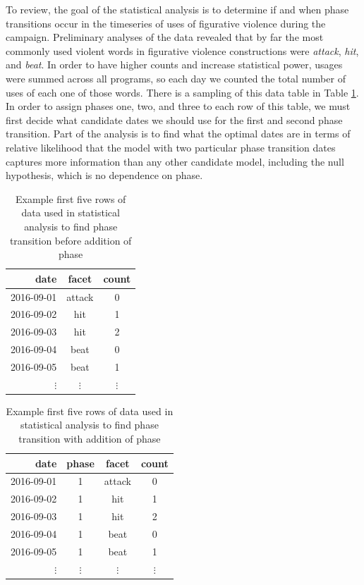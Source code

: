 To review, the goal of the statistical analysis is to determine if and when
phase transitions occur in the timeseries of uses of figurative violence
during the campaign. Preliminary analyses of the data revealed that by far
the most commonly used violent words in figurative violence constructions were
\textit{attack}, \textit{hit}, and \textit{beat}. In order to have higher 
counts and increase statistical power, usages were summed across all programs,
so each day we counted the total number of uses of each one of those words.
There is a sampling of this data table in Table \ref{tab:sample-data}. In 
order to assign phases one, two, and three to each row of this table, we
must first decide what candidate dates we should use for the first and
second phase transition. Part of the analysis is to find what the optimal 
dates are in terms of relative likelihood that the model with two particular
phase transition dates captures more information than any other candidate
model, including the null hypothesis, which is no dependence on phase.

\begin{table}[ht]
    \centering
    \begin{tabular}{|r|cc|}
        \hline
        date       &   facet    &  count     \\
        \hline
        2016-09-01 &     attack &    0     \\
        2016-09-02 &     hit    &    1     \\
        2016-09-03 &     hit    &    2     \\
        2016-09-04 &     beat   &    0     \\
        2016-09-05 &     beat   &    1     \\
        $\vdots$   &  $\vdots$  & $\vdots$ \\
    \end{tabular}
    \caption{Example first five rows of data used in statistical analysis to find
    phase transition before addition of phase}
    \label{tab:sample-data}
\end{table}

\begin{table}[ht]
    \centering
    \begin{tabular}{|r|ccc|}
        \hline
        date       &  phase  &   facet    &  count     \\
        \hline               
        2016-09-01 &    1    &     attack &    0     \\
        2016-09-02 &    1    &     hit    &    1     \\
        2016-09-03 &    1    &     hit    &    2     \\
        2016-09-04 &    1    &     beat   &    0     \\
        2016-09-05 &    1    &     beat   &    1     \\
        $\vdots$   & $\vdots$&  $\vdots$  & $\vdots$ \\
    \end{tabular}
    \caption{Example first five rows of data used in statistical analysis to find
    phase transition with addition of phase}
    \label{tab:sample-data-wphase}
\end{table}



